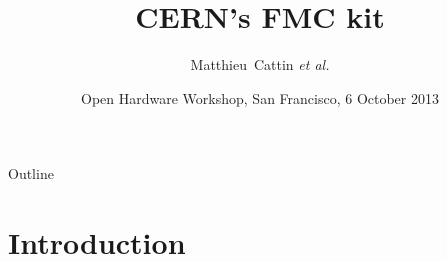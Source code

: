 \documentclass[compress,red]{beamer}
\title[CERN's FMC kit] %
{CERN's FMC kit}
\author[Matthieu Cattin] %
{\mbox{Matthieu Cattin} \textit{et al.}}
\institute%
{
  CERN, Geneva, Switzerland
 }
\date[OH Workshop] %
{Open Hardware Workshop, San Francisco, 6 October 2013}
\begin{document}
\begin{frame}
  \titlepage
\end{frame}

\begin{frame}{Outline}
  \tableofcontents
\end{frame}







\section{Introduction}

\subsection*{}
\end{document}
